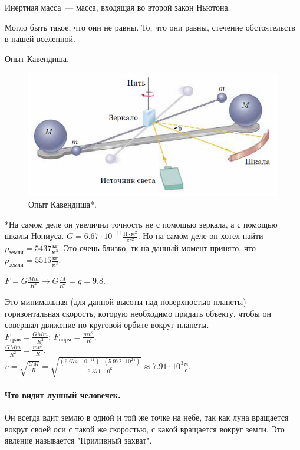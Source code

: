 \documentclass[12pt]{article}
\begin{document}
	\begin{definition}
		Инертная масса~--- масса, входящая во второй закон Ньютона.
	\end{definition}
	\begin{statement}
		Могло быть такое, что они не равны. То, что они равны, стечение обстоятельств в нашей вселенной.
	\end{statement}
	\begin{definition}
		Опыт Кавендиша.
		\begin{figure}[H]
			\includegraphics[height=0.25\textwidth]{extra-materials/Опыт-Кавендиша}
			\caption{Опыт Кавендиша*.}
		\end{figure}
		*На самом деле он увеличил точность не с помощью зеркала, а с помощью шкалы Нониуса. $G = 6.67 \cdot 10^{-11} \frac{\text{Н} \cdot \text{м}^2}{\text{кг}^2}$. Но на самом деле он хотел найти $\rho_{\text{земли}} = 5437 \frac{\text{кг}}{\text{м}^3}$. Это очень близко, тк на данный момент принято, что $\rho_{\text{земли}} = 5515 \frac{\text{кг}}{\text{м}^3}$.
	\end{definition}
	\begin{definition}
		$F = G \frac{Mm}{R^2} \rightarrow G \frac{M}{R^2} = g = 9.8$.
	\end{definition}
	\begin{definition}
		Это минимальная (для данной высоты над поверхностью планеты) горизонтальная скорость, которую необходимо придать объекту, чтобы он совершал движение по круговой орбите вокруг планеты. \\
		$F_{\text{грав}} = \frac{GMm}{R^2}$; $F_{\text{норм}} = \frac{mv^2}{R}$. \\
		$\frac{GMm}{R^2} = \frac{mv^2}{R}$. \\
		$v = \sqrt{\frac{GM}{R}} = \sqrt{\frac{(6.674 \cdot 10^{-11}) \cdot (5.972 \cdot 10^{24})}{6.371 \cdot 10^6}} \approx 7.91 \cdot 10^3 \frac{\text{м}}{\text{с}}$.
	\end{definition}
	\paragraph{Что видит лунный человечек.} Он всегда вдит землю в одной и той же точке на небе, так как луна вращается вокруг своей оси с такой же скоростью, с какой вращается вокруг земли. Это явление называется "Приливный захват".
\end{document}
